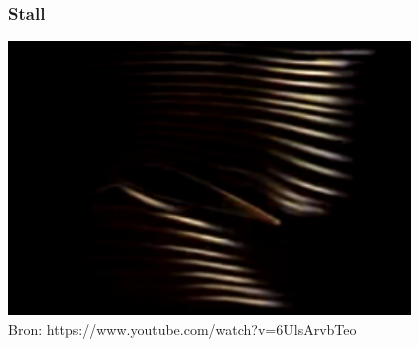 \documentclass[t]{beamer}
\begin{document}
  	\begin{frame}
		\frametitle{Stall}
		\center
		\href{run:fig/uitwendige_stroming/Streamlines_around_an_airfoil.mp4}{
			\includegraphics[width=0.8\textwidth]{../fig/uitwendige_stroming/Streamlines_around_an_airfoil.png}
		}\\
		\footnotesize{Bron: https://www.youtube.com/watch?v=6UlsArvbTeo}
  	\end{frame}
\end{document}
